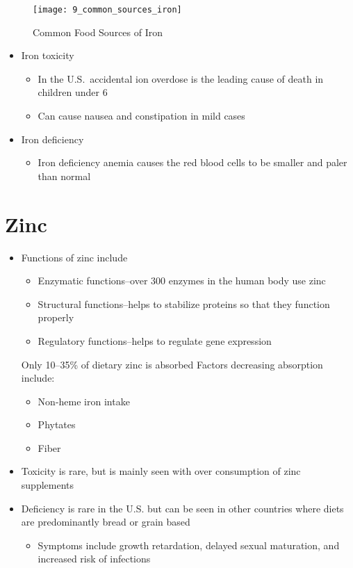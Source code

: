 \documentclass[title={Chapter 9}]{fdsn201notes}
\begin{document}
\begin{figure}[H]
	\centering
	\texttt{[image: 9\_common\_sources\_iron]}
	\caption{Common Food Sources of Iron}
	\label{fig:common-food-sources-of-iron}
\end{figure}

\begin{itemize}
	\item Iron toxicity
	\begin{itemize}
		\item In the U.S.\ accidental ion overdose is the leading cause of death in children under 6
		\item Can cause nausea and constipation in mild cases
	\end{itemize}
	\item Iron deficiency
	\begin{itemize}
		\item Iron deficiency anemia causes the red blood cells to be smaller and paler than normal
	\end{itemize}
\end{itemize}

\section{Zinc}\label{sec:Zinc}
\begin{itemize}
	\item Functions of zinc include
	\begin{itemize}
		\item Enzymatic functions--over 300 enzymes in the human body use zinc
		\item Structural functions--helps to stabilize proteins so that they function properly
		\item Regulatory functions--helps to regulate gene expression
	\end{itemize}
	Only 10--35\% of dietary zinc is absorbed
	Factors decreasing absorption include:
	\begin{itemize}
		\item Non-heme iron intake
		\item Phytates
		\item Fiber
	\end{itemize}
	\item Toxicity is rare, but is mainly seen with over consumption of zinc supplements
	\item Deficiency is rare in the U.S. but can be seen in other countries where diets are predominantly bread or grain based
	\begin{itemize}
		\item Symptoms include growth retardation, delayed sexual maturation, and increased risk of infections
	\end{itemize}
\end{itemize}
\end{document}
